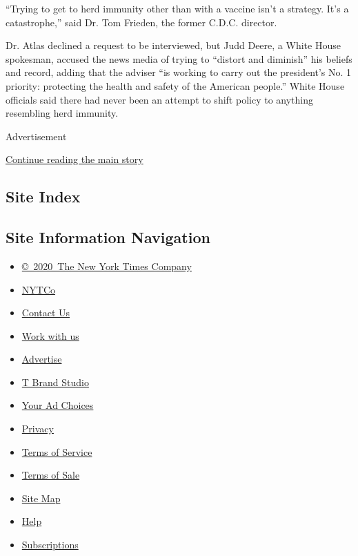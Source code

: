 ``Trying to get to herd immunity other than with a vaccine isn't a
strategy. It's a catastrophe,'' said Dr. Tom Frieden, the former C.D.C.
director.

Dr. Atlas declined a request to be interviewed, but Judd Deere, a White
House spokesman, accused the news media of trying to ``distort and
diminish'' his beliefs and record, adding that the adviser ``is working
to carry out the president's No. 1 priority: protecting the health and
safety of the American people.'' White House officials said there had
never been an attempt to shift policy to anything resembling herd
immunity.

Advertisement

\protect\hyperlink{after-bottom}{Continue reading the main story}

\hypertarget{site-index}{%
\subsection{Site Index}\label{site-index}}

\hypertarget{site-information-navigation}{%
\subsection{Site Information
Navigation}\label{site-information-navigation}}

\begin{itemize}
\tightlist
\item
  \href{https://help.nytimes3xbfgragh.onion/hc/en-us/articles/115014792127-Copyright-notice}{©~2020~The
  New York Times Company}
\end{itemize}

\begin{itemize}
\tightlist
\item
  \href{https://www.nytco.com/}{NYTCo}
\item
  \href{https://help.nytimes3xbfgragh.onion/hc/en-us/articles/115015385887-Contact-Us}{Contact
  Us}
\item
  \href{https://www.nytco.com/careers/}{Work with us}
\item
  \href{https://nytmediakit.com/}{Advertise}
\item
  \href{http://www.tbrandstudio.com/}{T Brand Studio}
\item
  \href{https://www.nytimes3xbfgragh.onion/privacy/cookie-policy\#how-do-i-manage-trackers}{Your
  Ad Choices}
\item
  \href{https://www.nytimes3xbfgragh.onion/privacy}{Privacy}
\item
  \href{https://help.nytimes3xbfgragh.onion/hc/en-us/articles/115014893428-Terms-of-service}{Terms
  of Service}
\item
  \href{https://help.nytimes3xbfgragh.onion/hc/en-us/articles/115014893968-Terms-of-sale}{Terms
  of Sale}
\item
  \href{https://spiderbites.nytimes3xbfgragh.onion}{Site Map}
\item
  \href{https://help.nytimes3xbfgragh.onion/hc/en-us}{Help}
\item
  \href{https://www.nytimes3xbfgragh.onion/subscription?campaignId=37WXW}{Subscriptions}
\end{itemize}

